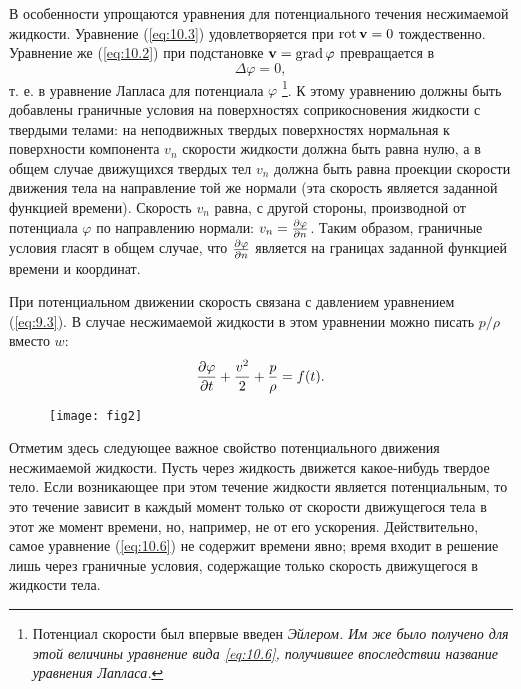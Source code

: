 В особенности упрощаются уравнения для потенциального течения несжимаемой
жидкости. Уравнение (\ref{eq:10.3}) удовлетворяется при $\mathop{\mathrm{rot}}\nolimits { \mathbf{v} } = 0$ тождественно.
Уравнение же (\ref{eq:10.2}) при подстановке ${\mathbf{v}} = \mathop{\mathrm{grad}}\nolimits \varphi$ превращается в
\begin{equation}
   \label{eq:10.6}
   \Delta \varphi = 0,
\end{equation}
т. е. в уравнение Лапласа для потенциала $\varphi$ \footnote{Потенциал скорости был
впервые введен \em{Эйлером}. Им же было получено для этой величины уравнение вида
\ref{eq:10.6}, получившее впоследствии название уравнения Лапласа.}. К этому уравнению должны
быть добавлены граничные условия на поверхностях соприкосновения жидкости с
твердыми телами: на неподвижных твердых поверхностях нормальная к поверхности
компонента $v_n$ скорости жидкости должна быть равна нулю, а в общем случае
движущихся твердых тел $v_n$ должна быть равна проекции скорости движения тела
на направление той же нормали (эта скорость является заданной функцией времени).
Скорость $v_n$ равна, с другой стороны, производной от потенциала $\varphi$ по
направлению нормали: $v_n = \frac{\partial{\varphi}}{\partial{n}}$. Таким образом, граничные условия
гласят в общем случае, что $\frac{\partial{\varphi}}{\partial{n}}$ является на границах заданной
функцией времени и координат.

При потенциальном движении скорость связана с давлением уравнением (\ref{eq:9.3}).
В случае несжимаемой жидкости в этом уравнении можно писать $p/\rho$ вместо $w$:
\begin{equation}
   \label{eq:10.7}
   \frac{\partial{\varphi}}{\partial{t}} + \frac{v^2}{2} + \frac{p}{\rho} = f(t).
\end{equation}

\begin{wrapfigure}{l}{6cm}
  \centering
  \texttt{[image: fig2]}
  \caption{\label{fig:f2}}
\end{wrapfigure}

Отметим здесь следующее важное свойство потенциального движения несжимаемой
жидкости. Пусть через жидкость движется какое-нибудь твердое тело. Если
возникающее при этом течение жидкости является потенциальным, то это течение
зависит в каждый момент только от скорости движущегося тела в этот же момент
времени, но, например, не от его ускорения. Действительно, самое уравнение
(\ref{eq:10.6}) не содержит времени явно; время входит в решение лишь через граничные
условия, содержащие только скорость движущегося в жидкости тела.

